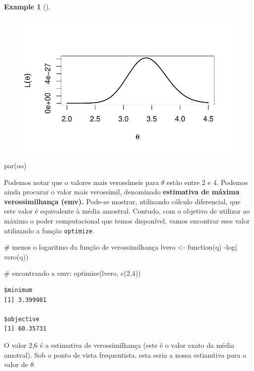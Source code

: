 \documentclass[
  letterpaper,
  DIV=11,
  numbers=noendperiod]{scrreprt}
\newenvironment{Shaded}{\begin{snugshade}}{\end{snugshade}}
\newcommand{\CommentTok}[1]{\textcolor[rgb]{0.37,0.37,0.37}{#1}}
\newcommand{\ControlFlowTok}[1]{\textcolor[rgb]{0.00,0.23,0.31}{#1}}
\newcommand{\DecValTok}[1]{\textcolor[rgb]{0.68,0.00,0.00}{#1}}
\newcommand{\FunctionTok}[1]{\textcolor[rgb]{0.28,0.35,0.67}{#1}}
\newcommand{\NormalTok}[1]{\textcolor[rgb]{0.00,0.23,0.31}{#1}}
\newcommand{\OtherTok}[1]{\textcolor[rgb]{0.00,0.23,0.31}{#1}}
\newcommand{\SpecialCharTok}[1]{\textcolor[rgb]{0.37,0.37,0.37}{#1}}
\theoremstyle{definition}
\newtheorem{example}{Example}[chapter]
\theoremstyle{definition}
\theoremstyle{remark}
\begin{document}
\begin{example}[]
\begin{figure}[H]
{\centering \includegraphics{intro_files/figure-pdf/unnamed-chunk-3-1.pdf}

}

\end{figure}

\begin{Shaded}
\begin{Highlighting}[]
\FunctionTok{par}\NormalTok{(oo)}
\end{Highlighting}
\end{Shaded}

Podemos notar que o valores mais verossímeis para \(\theta\) estão entre
2 e 4. Podemos ainda procurar o valor mais verossímil, denominado
\textbf{estimativa de máxima verossimilhança (emv).} Pode-se mostrar,
utilizando cálculo diferencial, que este valor é equivalente à média
amostral. Contudo, com o objetivo de utilizar ao máximo o poder
computacional que temos disponível, vamos encontrar esse valor
utilizando a função \texttt{optimize}.

\begin{Shaded}
\begin{Highlighting}[]
\CommentTok{\# menos o logaritmo da função de verossimilhança}
\NormalTok{lvero }\OtherTok{\textless{}{-}} \ControlFlowTok{function}\NormalTok{(q) }\SpecialCharTok{{-}}\FunctionTok{log}\NormalTok{( }\FunctionTok{vero}\NormalTok{(q))}

\CommentTok{\# encontrando a emv:}
\FunctionTok{optimise}\NormalTok{(lvero, }\FunctionTok{c}\NormalTok{(}\DecValTok{2}\NormalTok{,}\DecValTok{4}\NormalTok{))}
\end{Highlighting}
\end{Shaded}

\begin{verbatim}
$minimum
[1] 3.399981

$objective
[1] 60.35731
\end{verbatim}

O valor 2,6 é a estimativa de verossimilhança (este é o valor exato da
média amotral). Sob o ponto de vista frequentista, esta seria a nossa
estiamtiva para o valor de \(\theta\).

\end{example}
\end{document}
